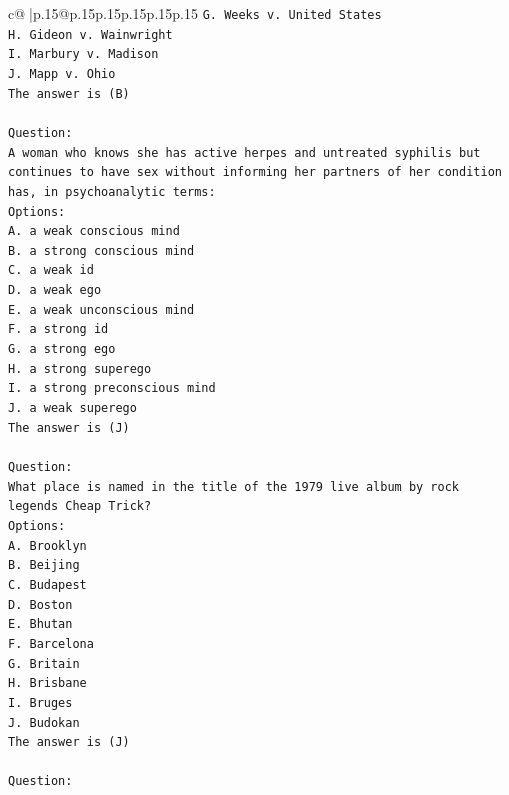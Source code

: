\documentclass{article}
\begin{document}
{\begin{supertabular}{c@{$\;$}|p{.15\linewidth}@{}p{.15\linewidth}p{.15\linewidth}p{.15\linewidth}p{.15\linewidth}p{.15\linewidth}}
{{{\texttt{G. Weeks v. United States} \\
\texttt{H. Gideon v. Wainwright} \\
\texttt{I. Marbury v. Madison} \\
\texttt{J. Mapp v. Ohio} \\
\texttt{The answer is (B)} \\
\\ 
\texttt{Question:} \\
\texttt{A woman who knows she has active herpes and untreated syphilis but continues to have sex without informing her partners of her condition has, in psychoanalytic terms:} \\
\texttt{Options:} \\
\texttt{A. a weak conscious mind} \\
\texttt{B. a strong conscious mind} \\
\texttt{C. a weak id} \\
\texttt{D. a weak ego} \\
\texttt{E. a weak unconscious mind} \\
\texttt{F. a strong id} \\
\texttt{G. a strong ego} \\
\texttt{H. a strong superego} \\
\texttt{I. a strong preconscious mind} \\
\texttt{J. a weak superego} \\
\texttt{The answer is (J)} \\
\\ 
\texttt{Question:} \\
\texttt{What place is named in the title of the 1979 live album by rock legends Cheap Trick?} \\
\texttt{Options:} \\
\texttt{A. Brooklyn} \\
\texttt{B. Beijing} \\
\texttt{C. Budapest} \\
\texttt{D. Boston} \\
\texttt{E. Bhutan} \\
\texttt{F. Barcelona} \\
\texttt{G. Britain} \\
\texttt{H. Brisbane} \\
\texttt{I. Bruges} \\
\texttt{J. Budokan} \\
\texttt{The answer is (J)} \\
\\ 
\texttt{Question:} \\
}}}
\end{supertabular}}
\end{document}
